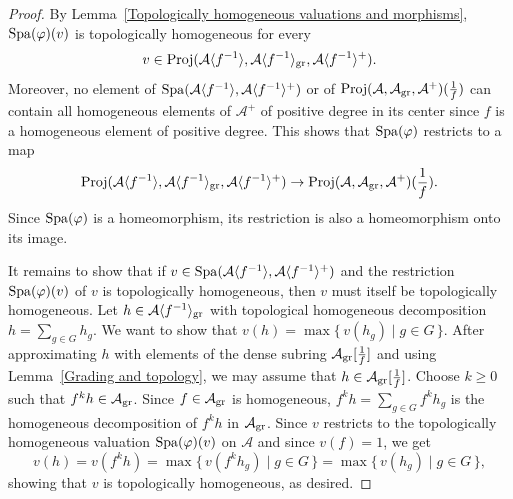 \documentclass[12pt,twoside,a4paper]{article}
\theoremstyle{definition}
\theoremstyle{remark}
\newcommand\gr{{\rm gr}}
\newcommand\Proj{{\rm Proj}}
\newcommand\Spa{{\rm Spa}}
\begin{document}
\begin{proof}By Lemma~\ref{Topologically homogeneous valuations and morphisms}, $\Spa(\varphi)(v)$ is topologically homogeneous for every \begin{equation*}v\in \Proj(\mathcal{A}\langle f^{-1}\rangle, \mathcal{A}\langle f^{-1}\rangle_{\gr}, \mathcal{A}\langle f^{-1}\rangle^{+}).\end{equation*}Moreover, no element of $\Spa(\mathcal{A}\langle f^{-1}\rangle, \mathcal{A}\langle f^{-1}\rangle^{+})$ or of $\Proj(\mathcal{A}, \mathcal{A}_{\gr}, \mathcal{A}^{+})(\frac{1}{f})$ can contain all homogeneous elements of $\mathcal{A}^{+}$ of positive degree in its center since $f$ is a homogeneous element of positive degree. This shows that $\Spa(\varphi)$ restricts to a map \begin{equation*}\Proj(\mathcal{A}\langle f^{-1}\rangle, \mathcal{A}\langle f^{-1}\rangle_{\gr}, \mathcal{A}\langle f^{-1}\rangle^{+})\to \Proj(\mathcal{A}, \mathcal{A}_{\gr}, \mathcal{A}^{+})(\frac{1}{f}).\end{equation*}Since $\Spa(\varphi)$ is a homeomorphism, its restriction is also a homeomorphism onto its image.

It remains to show that if $v\in \Spa(\mathcal{A}\langle f^{-1}\rangle, \mathcal{A}\langle f^{-1}\rangle^{+})$ and the restriction $\Spa(\varphi)(v)$ of $v$ is topologically homogeneous, then $v$ must itself be topologically homogeneous. Let $h\in \mathcal{A}\langle f^{-1}\rangle_{\gr}$ with topological homogeneous decomposition $h=\sum_{g\in G}h_{g}$. We want to show that $v(h)=\max\{\, v(h_{g})\mid g\in G\,\}$. After approximating $h$ with elements of the dense subring $\mathcal{A}_{\gr}[\frac{1}{f}]$ and using Lemma~\ref{Grading and topology}, we may assume that $h\in \mathcal{A}_{\gr}[\frac{1}{f}]$. Choose $k\geq0$ such that $f^{k}h\in \mathcal{A}_{\gr}$. Since $f\in \mathcal{A}_{\gr}$ is homogeneous, $f^{k}h=\sum_{g\in G}f^{k}h_{g}$ is the homogeneous decomposition of $f^{k}h$ in $\mathcal{A}_{\gr}$. Since $v$ restricts to the topologically homogeneous valuation $\Spa(\varphi)(v)$ on $\mathcal{A}$ and since $v(f)=1$, we get \begin{equation*}v(h)=v(f^{k}h)=\max\{\, v(f^{k}h_{g})\mid g\in G\,\}=\max\{\, v(h_{g})\mid g\in G\,\},\end{equation*}showing that $v$ is topologically homogeneous, as desired. \end{proof}
\end{document}

